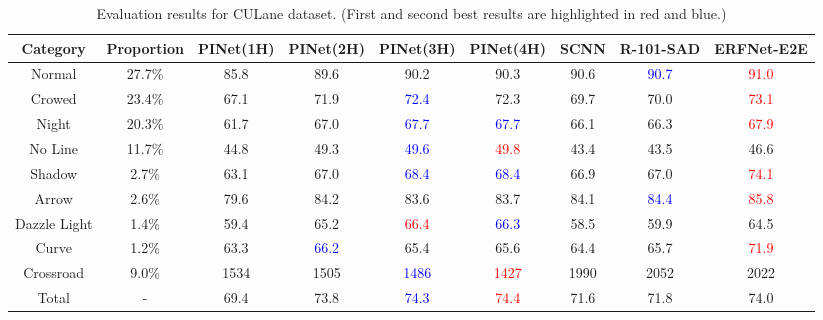 \documentclass[journal]{IEEEtran}
\begin{document}
\begin{table*}[ht]
    \caption{Evaluation results for CULane dataset. \newline(First and second best results are highlighted in red and blue.)}
    \begin{center}
        \begin{tabular}{|c|c|c|c|c|c|c|c|c|}
            \hline
            Category & Proportion & PINet(1H) & PINet(2H) & PINet(3H) & PINet(4H) & SCNN \cite{pan2018spatial} & R-101-SAD \cite{hou2019learning} & ERFNet-E2E \cite{yoo2020end}\\
            \hline
            \hline
            Normal & 27.7\% & 85.8 & 89.6 & 90.2 & 90.3 & 90.6 & \textcolor{blue}{90.7} & \textcolor{red}{91.0} \\
            \hline
            Crowed & 23.4\% & 67.1 & 71.9 & \textcolor{blue}{72.4} & 72.3 & 69.7 & 70.0 & \textcolor{red}{73.1} \\
            \hline
            Night & 20.3\% & 61.7 & 67.0 & \textcolor{blue}{67.7} & \textcolor{blue}{67.7} & 66.1 & 66.3 & \textcolor{red}{67.9} \\
            \hline
            No Line & 11.7\% & 44.8 & 49.3 & \textcolor{blue}{49.6} & \textcolor{red}{49.8} & 43.4 & 43.5 & 46.6 \\
            \hline
            Shadow & 2.7\% & 63.1 & 67.0 & \textcolor{blue}{68.4} & \textcolor{blue}{68.4} & 66.9 & 67.0 & \textcolor{red}{74.1} \\
            \hline
            Arrow & 2.6\% & 79.6 & 84.2 & 83.6 & 83.7 & 84.1 & \textcolor{blue}{84.4} & \textcolor{red}{85.8} \\
            \hline
            Dazzle Light & 1.4\% & 59.4 & 65.2 & \textcolor{red}{66.4} & \textcolor{blue}{66.3} & 58.5 & 59.9 & 64.5 \\
            \hline
            Curve & 1.2\% & 63.3 & \textcolor{blue}{66.2} & 65.4 & 65.6 & 64.4 & 65.7 & \textcolor{red}{71.9} \\
            \hline
            Crossroad & 9.0\% & 1534 & 1505 & \textcolor{blue}{1486} & \textcolor{red}{1427} & 1990 & 2052 & 2022 \\
            \hline
            \hline
            Total & - & 69.4 & 73.8 & \textcolor{blue}{74.3} & \textcolor{red}{74.4} & 71.6 & 71.8 & 74.0 \\
            \hline
        \end{tabular}
    \end{center}
\end{table*}
\end{document}
